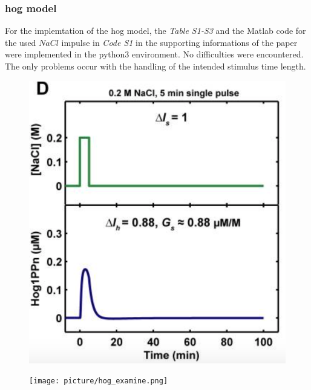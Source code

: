 \subsubsection{hog model}
For the implemtation of the hog model, the \textit{Table S1-S3} and the Matlab code for the used $NaCl$ impulse in \textit{Code S1 } in the supporting informations of the paper were implemented in the python3 environment. No difficulties were encountered. The only problems occur with the handling of the intended stimulus time length.

\begin{figure}[htbp]
	
	\begin{minipage}{0,5\textwidth}
		
		\includegraphics[width=\textwidth]{picture/Hog_Paper.png}
		
		\label{hogPaper} 
	\end{minipage}
	\begin{minipage}{0,5\textwidth}
		
		\texttt{[image: picture/hog\_examine.png]}
		
		\label{hogImplemented} 
	\end{minipage}
	\caption{}
\end{figure}

